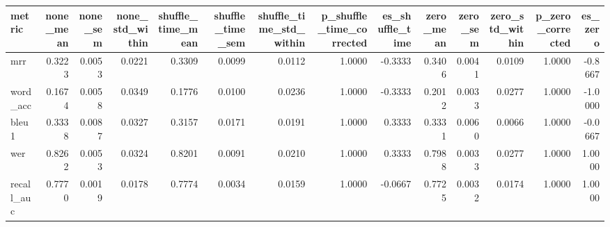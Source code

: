 \begin{tabular}{lrrrrrrrrrrrrr}
\toprule
metric & none_mean & none_sem & none_std_within & shuffle_time_mean & shuffle_time_sem & shuffle_time_std_within & p_shuffle_time_corrected & es_shuffle_time & zero_mean & zero_sem & zero_std_within & p_zero_corrected & es_zero \\
\midrule
mrr & 0.3223 & 0.0053 & 0.0221 & 0.3309 & 0.0099 & 0.0112 & 1.0000 & -0.3333 & 0.3406 & 0.0041 & 0.0109 & 1.0000 & -0.8667 \\
word_acc & 0.1674 & 0.0058 & 0.0349 & 0.1776 & 0.0100 & 0.0236 & 1.0000 & -0.3333 & 0.2012 & 0.0033 & 0.0277 & 1.0000 & -1.0000 \\
bleu1 & 0.3338 & 0.0087 & 0.0327 & 0.3157 & 0.0171 & 0.0191 & 1.0000 & 0.3333 & 0.3331 & 0.0060 & 0.0066 & 1.0000 & -0.0667 \\
wer & 0.8262 & 0.0053 & 0.0324 & 0.8201 & 0.0091 & 0.0210 & 1.0000 & 0.3333 & 0.7988 & 0.0033 & 0.0277 & 1.0000 & 1.0000 \\
recall_auc & 0.7770 & 0.0019 & 0.0178 & 0.7774 & 0.0034 & 0.0159 & 1.0000 & -0.0667 & 0.7725 & 0.0032 & 0.0174 & 1.0000 & 1.0000 \\
\bottomrule
\end{tabular}
